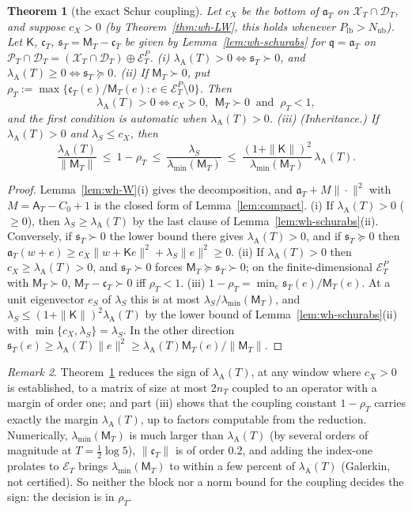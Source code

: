 \documentclass[11pt]{amsart}
\newtheorem{theorem}{Theorem}[section]
\theoremstyle{definition}
\theoremstyle{remark}
\newtheorem{remark}[theorem]{Remark}
\newcommand{\PT}{\mathcal P_T}
\newcommand{\lamA}{\lambda_{\mathrm A}(T)}
\newcommand{\Aconst}{\mathsf A_T}
\begin{document}
\begin{theorem}[the exact Schur coupling]\label{thm:wh-schur}
Let $c_X$ be the bottom of $\mathfrak a_T$ on $\mathcal X_T\cap\mathcal D_T$, and suppose $c_X>0$ (by
Theorem~\ref{thm:wh-LW}, this holds whenever $P_{\mathrm{lb}}>N_{\mathrm{ub}}$). Let $\mathsf K$, $\mathfrak c_T$, $\mathfrak s_T=\mathsf M_T-\mathfrak c_T$
be given by Lemma~\ref{lem:wh-schurabs} for $\mathfrak q=\mathfrak a_T$ on $\PT\cap\mathcal D_T=(\mathcal X_T\cap\mathcal D_T)\oplus\mathcal E^P_T$.
\emph{(i)} $\lamA>0\iff\mathfrak s_T\succ0$, and $\lamA\ge0\iff\mathfrak s_T\succeq0$.
\emph{(ii)} If $\mathsf M_T\succ0$, put $\rho_T:=\max\{\mathfrak c_T(e)/\mathsf M_T(e):e\in\mathcal E^P_T\setminus0\}$. Then
\[
\lamA>0\iff c_X>0,\ \ \mathsf M_T\succ0\ \text{ and }\ \rho_T<1 ,
\]
and the first condition is automatic when $\lamA>0$.
\emph{(iii) (Inheritance.)} If $\lamA>0$ and $\lambda_S\le c_X$, then
\[
\frac{\lamA}{\|\mathsf M_T\|}\ \le\ 1-\rho_T\ \le\ \frac{\lambda_S}{\lambda_{\min}(\mathsf M_T)}\ \le\ \frac{(1+\|\mathsf K\|)^2}{\lambda_{\min}(\mathsf M_T)}\,\lamA .
\]
\end{theorem}

\begin{proof}
Lemma~\ref{lem:wh-W}(i) gives the decomposition, and $\mathfrak a_T+M\|\cdot\|^2$ with $M=\Aconst-C_0+1$ is the closed
form of Lemma~\ref{lem:compact}. (i) If $\lamA>0$ ($\ge0$), then $\lambda_S\ge\lamA$ by the last clause of
Lemma~\ref{lem:wh-schurabs}(ii). Conversely, if $\mathfrak s_T\succ0$ the lower bound there gives $\lamA>0$, and if
$\mathfrak s_T\succeq0$ then $\mathfrak a_T(w+e)\ge c_X\|w+\mathsf Ke\|^2+\lambda_S\|e\|^2\ge0$. (ii) If $\lamA>0$ then $c_X\ge\lamA>0$, and
$\mathfrak s_T\succ0$ forces $\mathsf M_T\succeq\mathfrak s_T\succ0$; on the finite-dimensional $\mathcal E^P_T$ with $\mathsf M_T\succ0$,
$\mathsf M_T-\mathfrak c_T\succ0$ iff $\rho_T<1$. (iii) $1-\rho_T=\min_e\mathfrak s_T(e)/\mathsf M_T(e)$. At a unit eigenvector $e_S$
of $\lambda_S$ this is at most $\lambda_S/\lambda_{\min}(\mathsf M_T)$, and $\lambda_S\le(1+\|\mathsf K\|)^2\lamA$ by the lower bound of
Lemma~\ref{lem:wh-schurabs}(ii) with $\min\{c_X,\lambda_S\}=\lambda_S$. In the other direction
$\mathfrak s_T(e)\ge\lamA\|e\|^2\ge\lamA\mathsf M_T(e)/\|\mathsf M_T\|$.
\end{proof}

\begin{remark}\label{rem:wh-schur}
Theorem~\ref{thm:wh-schur} reduces the sign of $\lamA$, at any window where $c_X>0$ is established, to a
matrix of size at most $2n_T$ coupled to an operator with a margin of order one; and part (iii) shows that the
coupling constant $1-\rho_T$ carries exactly the margin $\lamA$, up to factors computable from the reduction.
Numerically, $\lambda_{\min}(\mathsf M_T)$ is much larger than $\lamA$ (by several orders of magnitude at
$T=\frac12\log5$), $\|\mathfrak c_T\|$ is of order $0.2$, and adding the index-one prolates to $\mathcal E_T$ brings
$\lambda_{\min}(\mathsf M_T)$ to within a few percent of $\lamA$ (Galerkin, not certified). So neither the block
nor a norm bound for the coupling decides the sign: the decision is in $\rho_T$.
\end{remark}
\end{document}
